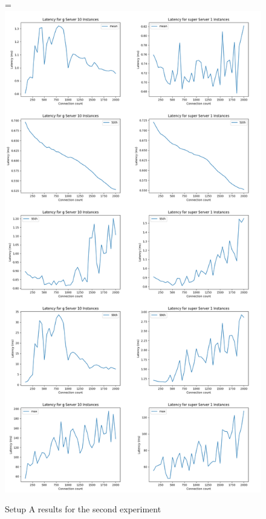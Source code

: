 \documentclass[12pt,oneandhalf,chaparabic,ceng,ms,eng,oneside,pntc]{gsufbe}
\makeatletter
\let\old@includegraphics\includegraphics
\renewcommand{\includegraphics}[2][,]{%
  \setbox9=\hbox{\old@includegraphics[#1]{#2}}%
  \ifdim\wd9>\textwidth
    \old@includegraphics[#1,width=\textwidth]{#2}%
  \else
    \old@includegraphics[#1]{#2}%
  \fi%
}
\makeatother
\begin{document}
\begin{figure}
\centering
\includegraphics[]{1vs10.png}
\caption{Setup A results for the second experiment}
\label{fig:1vs10}
\end{figure}
\end{document}
